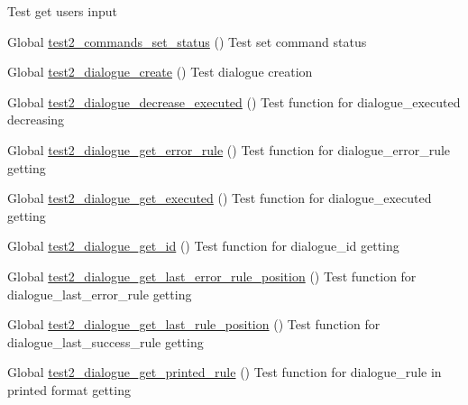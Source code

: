 \begin{DoxyRefList}
%
Test get user\textquotesingle{}s input  
\item[Global \mbox{\hyperlink{command__test_8c_a7bbd538701c49bc838ffe39f1d7b2047}{test2\+\_\+commands\+\_\+set\+\_\+status}} ()]\label{test__test000016}%
%
Test set command status  
\item[Global \mbox{\hyperlink{dialogue__test_8c_ae8d40aea4149ebac0405882532e55cb0}{test2\+\_\+dialogue\+\_\+create}} ()]\label{test__test000029}%
%
Test dialogue creation  
\item[Global \mbox{\hyperlink{dialogue__test_8c_ad2fcf6cc841df4575a929405d2614ac2}{test2\+\_\+dialogue\+\_\+decrease\+\_\+executed}} ()]\label{test__test000054}%
%
Test function for dialogue\+\_\+executed decreasing  
\item[Global \mbox{\hyperlink{dialogue__test_8c_a3f82fbf0365291edf72f979baf80aa67}{test2\+\_\+dialogue\+\_\+get\+\_\+error\+\_\+rule}} ()]\label{test__test000048}%
%
Test function for dialogue\+\_\+error\+\_\+rule getting  
\item[Global \mbox{\hyperlink{dialogue__test_8c_a2b0cb8bea2de7f29c9048fc978a87a3d}{test2\+\_\+dialogue\+\_\+get\+\_\+executed}} ()]\label{test__test000056}%
%
Test function for dialogue\+\_\+executed getting  
\item[Global \mbox{\hyperlink{dialogue__test_8c_a4f145be5023096ba4c4363b4dc6d48e2}{test2\+\_\+dialogue\+\_\+get\+\_\+id}} ()]\label{test__test000032}%
%
Test function for dialogue\+\_\+id getting  
\item[Global \mbox{\hyperlink{dialogue__test_8c_a9d97064502a4007445aade5f70126684}{test2\+\_\+dialogue\+\_\+get\+\_\+last\+\_\+error\+\_\+rule\+\_\+position}} ()]\label{test__test000041}%
%
Test function for dialogue\+\_\+last\+\_\+error\+\_\+rule getting  
\item[Global \mbox{\hyperlink{dialogue__test_8c_ab64afa1a529d03bb3b292b5217b33ee7}{test2\+\_\+dialogue\+\_\+get\+\_\+last\+\_\+rule\+\_\+position}} ()]\label{test__test000038}%
%
Test function for dialogue\+\_\+last\+\_\+success\+\_\+rule getting  
\item[Global \mbox{\hyperlink{dialogue__test_8c_a60dca038ffe43c4392ea0784f72dbbb2}{test2\+\_\+dialogue\+\_\+get\+\_\+printed\+\_\+rule}} ()]\label{test__test000068}%
%
Test function for dialogue\+\_\+rule in printed format getting  

\end{DoxyRefList}

